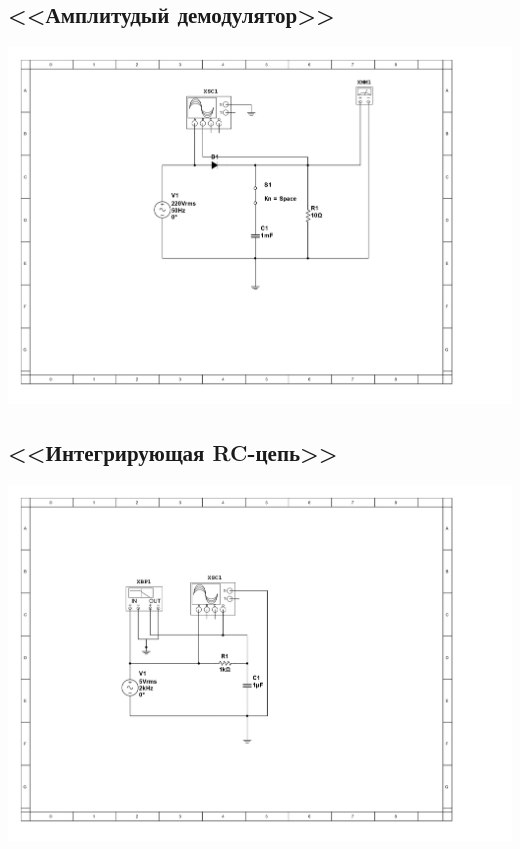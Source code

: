 \documentclass[11pt]{article}
\begin{document}
\subsection{<<Амплитудый демодулятор>>}
\includegraphics[width=1\linewidth]{1/scheme.jpg}
\subsection{<<Интегрирующая RC-цепь>>}
\includegraphics[width=1\linewidth]{2/scheme.jpg}
\end{document}
